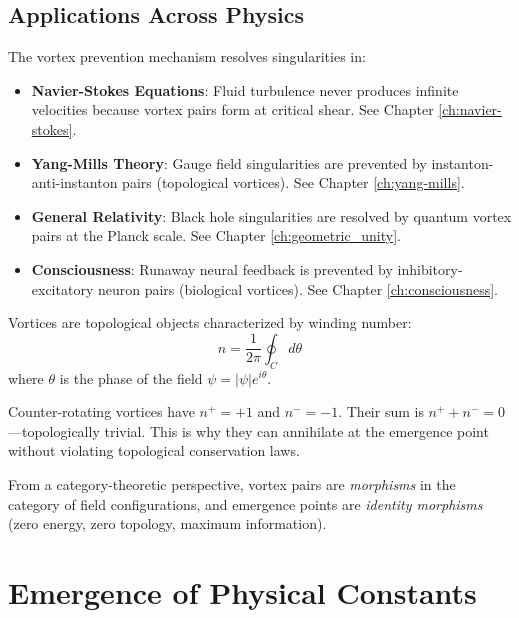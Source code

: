 \subsection{Applications Across Physics}

The vortex prevention mechanism resolves singularities in:

\begin{itemize}
\item \textbf{Navier-Stokes Equations}: Fluid turbulence never produces infinite velocities because vortex pairs form at critical shear. See Chapter \ref{ch:navier-stokes}.

\item \textbf{Yang-Mills Theory}: Gauge field singularities are prevented by instanton-anti-instanton pairs (topological vortices). See Chapter \ref{ch:yang-mills}.

\item \textbf{General Relativity}: Black hole singularities are resolved by quantum vortex pairs at the Planck scale. See Chapter \ref{ch:geometric_unity}.

\item \textbf{Consciousness}: Runaway neural feedback is prevented by inhibitory-excitatory neuron pairs (biological vortices). See Chapter \ref{ch:consciousness}.
\end{itemize}

\begin{level3}
Vortices are topological objects characterized by winding number:
\begin{equation}
n = \frac{1}{2\pi} \oint_C d\theta
\end{equation}
where $\theta$ is the phase of the field $\psi = |\psi|e^{i\theta}$.

Counter-rotating vortices have $n^+ = +1$ and $n^- = -1$. Their sum is $n^+ + n^- = 0$---topologically trivial. This is why they can annihilate at the emergence point without violating topological conservation laws.

From a category-theoretic perspective, vortex pairs are \textit{morphisms} in the category of field configurations, and emergence points are \textit{identity morphisms} (zero energy, zero topology, maximum information).
\end{level3}

\section{Emergence of Physical Constants}

